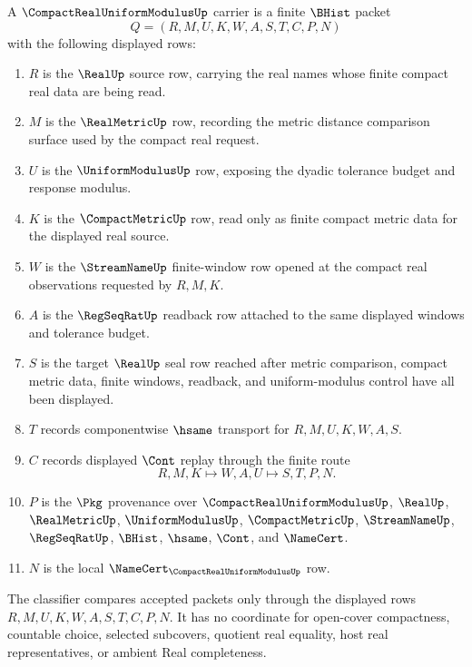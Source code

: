 \begin{definition}
\label{def:compact-real-uniform-modulus-carrier}
A $\CompactRealUniformModulusUp$ carrier is a finite $\BHist$ packet
$$
Q=(R,M,U,K,W,A,S,T,C,P,N)
$$
with the following displayed rows:
\begin{enumerate}
\item $R$ is the $\RealUp$ source row, carrying the real names whose finite compact real data are being read.
\item $M$ is the $\RealMetricUp$ row, recording the metric distance comparison surface used by the compact real request.
\item $U$ is the $\UniformModulusUp$ row, exposing the dyadic tolerance budget and response modulus.
\item $K$ is the $\CompactMetricUp$ row, read only as finite compact metric data for the displayed real source.
\item $W$ is the $\StreamNameUp$ finite-window row opened at the compact real observations requested by $R,M,K$.
\item $A$ is the $\RegSeqRatUp$ readback row attached to the same displayed windows and tolerance budget.
\item $S$ is the target $\RealUp$ seal row reached after metric comparison, compact metric data, finite windows, readback, and uniform-modulus control have all been displayed.
\item $T$ records componentwise $\hsame$ transport for $R,M,U,K,W,A,S$.
\item $C$ records displayed $\Cont$ replay through the finite route
$$
R,M,K \longmapsto W,A,U \longmapsto S,T,P,N .
$$
\item $P$ is the $\Pkg$ provenance over $\CompactRealUniformModulusUp$, $\RealUp$, $\RealMetricUp$, $\UniformModulusUp$, $\CompactMetricUp$, $\StreamNameUp$, $\RegSeqRatUp$, $\BHist$, $\hsame$, $\Cont$, and $\NameCert$.
\item $N$ is the local $\NameCert_{\CompactRealUniformModulusUp}$ row.
\end{enumerate}
The classifier compares accepted packets only through the displayed rows $R,M,U,K,W,A,S,T,C,P,N$. It has no coordinate for open-cover compactness, countable choice, selected subcovers, quotient real equality, host real representatives, or ambient Real completeness.
\end{definition}

